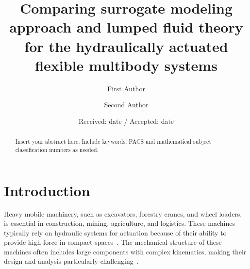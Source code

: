 \title{Comparing surrogate modeling approach and lumped fluid theory for the hydraulically actuated flexible multibody
systems%
}


\author{First Author         \and
        Second Author %
}



\date{Received: date / Accepted: date}


\maketitle






\begin{abstract}
Insert your abstract here. Include keywords, PACS and mathematical
subject classification numbers as needed.
\end{abstract}

\section{Introduction}
\label{intro}

Heavy mobile machinery, such as excavators, forestry cranes, and wheel loaders, is essential in construction, mining, agriculture, and logistics. These machines typically rely on hydraulic systems for actuation because of their ability to provide high force in compact spaces~\cite{jarkkorahikainen_2018_combined}. The mechanical structure of these machines often includes large components with complex kinematics, making their design and analysis particularly challenging~\cite{DADHICH2016212}.

